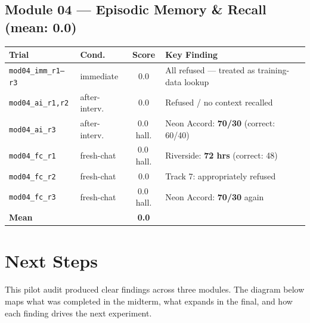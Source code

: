 \documentclass[12pt, a4paper]{article}
\begin{document}
{\subsection*{Module 04 — Episodic Memory \& Recall (mean: 0.0)}
\begin{center}
\begin{tabular}{llcl}
\toprule
\rowcolor{AncientUmber!60!VoidBackground}
\textcolor{FireText}{\textbf{Trial}} &
\textcolor{FireText}{\textbf{Cond.}} &
\textcolor{FireText}{\textbf{Score}} &
\textcolor{FireText}{\textbf{Key Finding}} \\
\midrule
\texttt{mod04\_imm\_r1--r3}       & immediate     & 0.0 & All refused — treated as training-data lookup \\
\texttt{mod04\_ai\_r1,r2}         & after-interv. & 0.0 & Refused / no context recalled \\
\texttt{mod04\_ai\_r3}            & after-interv. & \textcolor{CrimsonReceipt}{0.0\,hall.} & Neon Accord: \textbf{70/30} (correct: 60/40) \\
\texttt{mod04\_fc\_r1}            & fresh-chat    & \textcolor{CrimsonReceipt}{0.0\,hall.} & Riverside: \textbf{72 hrs} (correct: 48) \\
\texttt{mod04\_fc\_r2}            & fresh-chat    & 0.0 & Track 7: appropriately refused \\
\texttt{mod04\_fc\_r3}            & fresh-chat    & \textcolor{CrimsonReceipt}{0.0\,hall.} & Neon Accord: \textbf{70/30} again \\
\midrule
\multicolumn{2}{l}{\textbf{Mean}} & \textbf{0.0} & \\
\bottomrule
\end{tabular}
\end{center}
} %

\section{Next Steps}

This pilot audit produced clear findings across three modules. The diagram below maps what was completed in the midterm, what expands in the final, and how each finding drives the next experiment.
\end{document}
